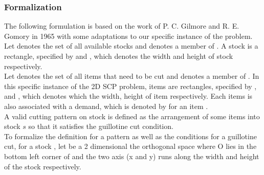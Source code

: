 \documentclass[a4paper]{article}
\begin{document}
    \subsubsection{Formalization} \label{chap:a}
    The following formulation is based on the work of P. C. Gilmore and R. E. Gomory in 1965 \cite{f6bab824-25b0-39e2-8f1e-13aaf2701321} with some adaptations to our specific instance of the problem.
    \vspace{0.2cm}\\
    Let  denotes the set of all available stocks and
     denotes a member of .
    A stock is a rectangle, specified by  and , which denotes the width and height of stock  respectively.
    \vspace{0.2cm}\\
    Let  denotes the set of all items that need to be cut and
     denotes a member of .
    In this specific instance of the 2D SCP problem, items are rectangles, specified by , and , which denotes which the width, height of item  respectively. Each items is also associated with a demand, which is denoted by  for an item .
    \vspace{0.2cm}\\
    A valid cutting pattern on stock  is defined as the arrangement of some items into stock \textbf{$s$} so that it satisfies the guillotine cut condition. 
    \vspace{0.2cm}\\
    To formalize the definition for a pattern as well as the conditions for a guillotine cut, for a stock , let  be a 2 dimensional the orthogonal space  where O lies in the bottom left corner of  and the two axis (x and y) runs along the width and height of the stock respectively. 
    \pagebreak
    
\end{document}
